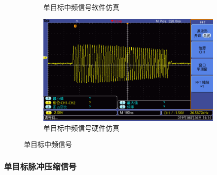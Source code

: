 \documentclass{article}
\newcounter{sub}
\begin{document}
\begin{figure}[H]
\begin{subfigure}[H]{.45\linewidth}
		\caption{单目标中频信号软件仿真}
		\label{fig:单目标中频信号软件仿真}
	\end{subfigure}
	\quad
	\begin{subfigure}[H]{.45\linewidth}
		\centering
		\includegraphics[width=\linewidth]{one-MF-hardware.png}
		\caption{单目标中频信号硬件仿真}
		\label{fig:单目标中频信号硬件仿真}
	\end{subfigure}
	\caption{单目标中频信号}
	\label{fig:单目标中频信号}
\end{figure}

\subsubsection{单目标脉冲压缩信号}%
\label{ssub:单目标脉冲压缩信号}
\end{document}
